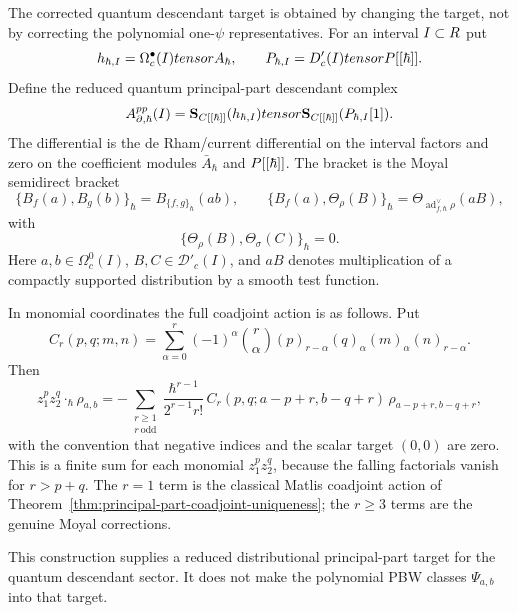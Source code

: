 \begin{constr}
  \label{constr:quantum-principal-part-descendant-target}
  The corrected quantum descendant target is obtained by changing the
  target, not by correcting the polynomial one-\(\psi\) representatives.
  For an interval \(I\subset R\) put
  \[
    h_{\hbar,I}
      =\Omega^\bullet_c(I)tensorA_\hbar,\qquad
    P_{\hbar,I}
      =D'_c(I)tensorP[[\hbar]].
  \]
  Define the reduced quantum principal-part descendant complex
  \[
    A^{pp}_{\partial,\hbar}(I)
    =
    \mathbf S_{C[[\hbar]]}(h_{\hbar,I})
    tensor
    \mathbf S_{C[[\hbar]]}(P_{\hbar,I}[1]).
  \]
  The differential is the de Rham/current differential on the interval
  factors and zero on the coefficient modules \(\bar A_\hbar\) and
  \(P[[\hbar]]\).  The bracket is the Moyal semidirect bracket
  \[
    \{B_f(a),B_g(b)\}_\hbar
      =B_{\{f,g\}_\hbar}(ab),\qquad
    \{B_f(a),\Theta_\rho(B)\}_\hbar
      =\Theta_{\operatorname{ad}^{\vee}_{f,\hbar}\rho}(aB),
  \]
  with
  \[
    \{\Theta_\rho(B),\Theta_\sigma(C)\}_\hbar=0.
  \]
  Here \(a,b\in\Omega^0_c(I)\), \(B,C\in\mathcal D'_c(I)\), and
  \(aB\) denotes multiplication of a compactly supported distribution by
  a smooth test function.

  In monomial coordinates the full coadjoint action is as follows.  Put
  \[
    C_r(p,q;m,n)=
      \sum_{\alpha=0}^{r}(-1)^\alpha\binom r\alpha
      (p)_{r-\alpha}(q)_\alpha(m)_\alpha(n)_{r-\alpha}.
  \]
  Then
  \[
    z_1^pz_2^q\cdot_\hbar\rho_{a,b}
    =
    -\sum_{\substack{r\geq1\\ r\ \mathrm{odd}}}
      \frac{\hbar^{r-1}}{2^{r-1}r!}\,
      C_r(p,q;a-p+r,b-q+r)\,
      \rho_{a-p+r,b-q+r},
  \]
  with the convention that negative indices and the scalar target
  \((0,0)\) are zero.  This is a finite sum for each monomial
  \(z_1^pz_2^q\), because the falling factorials vanish for
  \(r>p+q\).  The \(r=1\) term is the classical Matlis coadjoint action
  of Theorem~\ref{thm:principal-part-coadjoint-uniqueness}; the
  \(r\geq3\) terms are the genuine Moyal corrections.

  This construction supplies a reduced distributional principal-part
  target for the quantum descendant sector.  It does not make the
  polynomial PBW classes \(\Psi_{a,b}\) into that target.
\end{constr}

